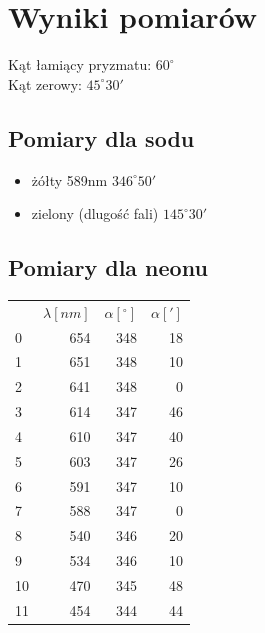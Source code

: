 \documentclass[a4paper,10pt]{article}
\begin{document}
\section{Wyniki pomiarów}
Kąt łamiący pryzmatu: $60^\circ$
\\Kąt zerowy: $45^\circ 30'$
\subsection{Pomiary dla sodu}
\begin{itemize}
  \item żółty 589nm $346^\circ 50'$ %
  \item zielony (dlugość fali) $145^\circ 30'$ %
\end{itemize}
\subsection{Pomiary dla neonu}
\begin{tabular}{lrrr}
{} &  $\lambda[nm]$ &  $\alpha[^\circ]$ &  $\alpha[']$ \\
0  &         654 &          348 &          18 \\
1  &         651 &          348 &          10 \\
2  &         641 &          348 &           0 \\
3  &         614 &          347 &          46 \\
4  &         610 &          347 &          40 \\
5  &         603 &          347 &          26 \\
6  &         591 &          347 &          10 \\
7  &         588 &          347 &           0 \\
8  &         540 &          346 &          20 \\
9  &         534 &          346 &          10 \\
10 &         470 &          345 &          48 \\
11 &         454 &          344 &          44 \\
\end{tabular}
\end{document}
